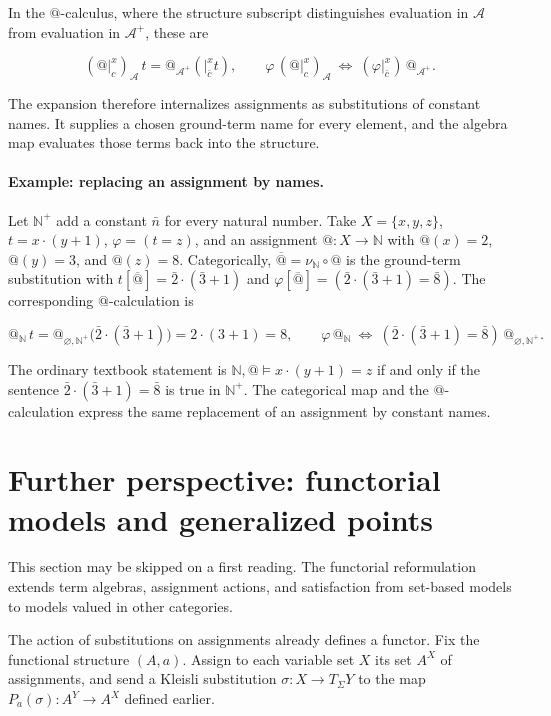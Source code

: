 \documentclass[11pt]{article}
\makeatletter
\newcommand{\atsign}{\mathord{@}}
\makeatother
\begin{document}
In the \(\atsign\)-calculus, where the structure subscript distinguishes
evaluation in \(\mathcal A\) from evaluation in \(\mathcal A^+\), these are

\[
\boxed{
(\atsign\vert_c^x)_{\mathcal A}\,t
=\atsign_{\mathcal A^+}(\vert_{\bar c}^x t),
\qquad
\varphi\,(\atsign\vert_c^x)_{\mathcal A}
\ \Longleftrightarrow\ 
(\varphi\vert_{\bar c}^x)\,\atsign_{\mathcal A^+}.
}
\]

The expansion therefore internalizes assignments as substitutions of
constant names. It supplies a chosen ground-term name for every element, and
the algebra map evaluates those terms back into the structure.

\paragraph{Example: replacing an assignment by names.}
Let \(\mathbb N^+\) add a constant \(\bar n\) for every natural number.
Take \(X=\{x,y,z\}\), \(t=x\cdot(y+1)\),
\(\varphi=(t=z)\), and an assignment \(\atsign:X\to\mathbb N\) with
\(\atsign(x)=2\), \(\atsign(y)=3\), and \(\atsign(z)=8\). Categorically,
\(\overline{\atsign}=\nu_{\mathbb N}\circ\atsign\) is the ground-term
substitution with
\(t[\overline{\atsign}]=\bar2\cdot(\bar3+1)\) and
\(\varphi[\overline{\atsign}]=
(\bar2\cdot(\bar3+1)=\bar8)\). The corresponding \(\atsign\)-calculation is

\[
\atsign_{\mathbb N}\,t
=\atsign_{\varnothing,\mathbb N^+}\bigl(\bar2\cdot(\bar3+1)\bigr)
=2\cdot(3+1)=8,
\qquad
\varphi\,\atsign_{\mathbb N}
\ \Longleftrightarrow\ 
(\bar2\cdot(\bar3+1)=\bar8)\,\atsign_{\varnothing,\mathbb N^+}.
\]

The ordinary textbook statement is
\(\mathbb N,\atsign\models x\cdot(y+1)=z\) if and only if the sentence
\(\bar2\cdot(\bar3+1)=\bar8\) is true in \(\mathbb N^+\). The categorical
map and the \(\atsign\)-calculation express the same replacement of an
assignment by constant names.

\section{Further perspective: functorial models and generalized points}
\label{functorial-models}

This section may be skipped on a first reading. The functorial reformulation
extends term algebras, assignment actions, and satisfaction from set-based
models to models valued in other categories.

The action of substitutions on assignments already defines a functor. Fix the
functional structure \((A,a)\). Assign to each variable set \(X\) its set
\(A^X\) of assignments, and send a Kleisli substitution
\(\sigma:X\to T_\Sigma Y\) to the map
\(P_a(\sigma):A^Y\to A^X\) defined earlier.
\end{document}
